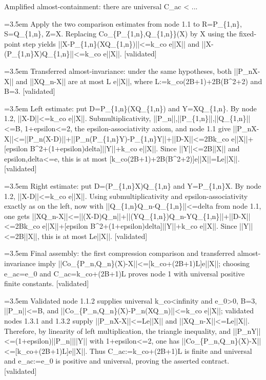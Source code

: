 \documentclass{article}
\newcommand{\step}[1]{\par\noindent\hangindent=3.5em\hangafter=1%
  \makebox[3.5em][l]{\textbf{#1.}}}
\newcommand{\steptag}[1]{\hfill{\small\textsf{[#1]}}}
\begin{document}
\begin{proofbox}{Amplified almost-containment: there are universal C\_ac < ...}
\step{1.2.2} Apply the two comparison estimates from node 1.1 to R=P\_\{1,n\}, S=Q\_\{1,n\}, Z=X. Replacing Co\_\{P\_\{1,n\},Q\_\{1,n\}\}(X) by X using the fixed-point step yields ||X-P\_\{1,n\}(XQ\_\{1,n\})||<=k\_co e||X|| and ||X-(P\_\{1,n\}X)Q\_\{1,n\}||<=k\_co e||X||. \steptag{validated} \\[4pt]
\step{1.3} Transferred almost-invariance: under the same hypotheses, both ||P\_nX-X|| and ||XQ\_n-X|| are at most L e||X||, where L:=k\_co(2B+1)+2B(B\textasciicircum{}2+2) and B=3. \steptag{validated} \\[6pt]
\step{1.3.1} Left estimate: put D=P\_\{1,n\}(XQ\_\{1,n\}) and Y=XQ\_\{1,n\}. By node 1.2, ||X-D||<=k\_co e||X||. Submultiplicativity, ||P\_n||,||P\_\{1,n\}||,||Q\_\{1,n\}||<=B, 1+epsilon<=2, the epsilon-associativity axiom, and node 1.1 give ||P\_nX-X||<=||P\_n(X-D)||+||P\_n(P\_\{1,n\}Y)-P\_\{1,n\}Y||+||D-X||<=2Bk\_co e||X||+[epsilon B\textasciicircum{}2+(1+epsilon)delta]||Y||+k\_co e||X||. Since ||Y||<=2B||X|| and epsilon,delta<=e, this is at most [k\_co(2B+1)+2B(B\textasciicircum{}2+2)]e||X||=Le||X||. \steptag{validated} \\[4pt]
\step{1.3.2} Right estimate: put D=(P\_\{1,n\}X)Q\_\{1,n\} and Y=P\_\{1,n\}X. By node 1.2, ||X-D||<=k\_co e||X||. Using submultiplicativity and epsilon-associativity exactly as on the left, now with ||Q\_\{1,n\}Q\_n-Q\_\{1,n\}||<=delta from node 1.1, one gets ||XQ\_n-X||<=||(X-D)Q\_n||+||(YQ\_\{1,n\})Q\_n-YQ\_\{1,n\}||+||D-X||<=2Bk\_co e||X||+[epsilon B\textasciicircum{}2+(1+epsilon)delta]||Y||+k\_co e||X||. Since ||Y||<=2B||X||, this is at most Le||X||. \steptag{validated} \\[4pt]
\step{1.4} Final assembly: the first compression comparison and transferred almost-invariance imply ||Co\_\{P\_n,Q\_n\}(X)-X||<=[k\_co+(2B+1)L]e||X||; choosing e\_ac=e\_0 and C\_ac=k\_co+(2B+1)L proves node 1 with universal positive finite constants. \steptag{validated} \\[6pt]
\step{1.4.1} Validated node 1.1.2 supplies universal k\_co<infinity and e\_0>0, B=3, ||P\_n||<=B, and ||Co\_\{P\_n,Q\_n\}(X)-P\_n(XQ\_n)||<=k\_co e||X||; validated nodes 1.3.1 and 1.3.2 supply ||P\_nX-X||<=Le||X|| and ||XQ\_n-X||<=Le||X||. Therefore, by linearity of left multiplication, the triangle inequality, and ||P\_nY||<=(1+epsilon)||P\_n||||Y|| with 1+epsilon<=2, one has ||Co\_\{P\_n,Q\_n\}(X)-X||<=[k\_co+(2B+1)L]e||X||. Thus C\_ac:=k\_co+(2B+1)L is finite and universal and e\_ac:=e\_0 is positive and universal, proving the asserted contract. \steptag{validated} \\[6pt]

\end{proofbox}
\end{document}

